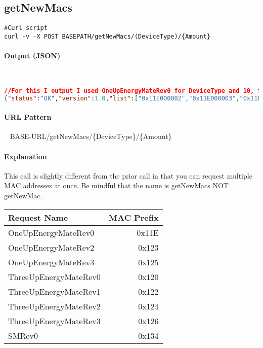 \documentclass[
10pt, %
letterpaper, %
oneside, %
headinclude,footinclude, %
BCOR5mm, %
]{scrartcl}
\begin{document}

\subsection{getNewMacs}
\begin{lstlisting}
#Curl script 
curl -v -X POST BASEPATH/getNewMacs/(DeviceType)/{Amount}
\end{lstlisting}

\paragraph{Output (JSON)}~
\begin{lstlisting}[language=json]
//For this I output I used OneUpEnergyMateRev0 for DeviceType and 10, for Amount
{"status":"OK","version":1.0,"list":["0x11E000002","0x11E000003","0x11E000004","0x11E000005","0x11E000006","0x11E000007","0x11E000008","0x11E000009","0x11E00000A","0x11E00000B"]}
\end{lstlisting}

\paragraph{URL Pattern} 
~\newline
BASE-URL/getNewMacs/\{DeviceType\}/\{Amount\}

\paragraph{Explanation}
This call is slightly different from the prior call in that you can request multiple MAC addresses at once. Be mindful that the name is getNewMacs NOT getNewMac. 
~\newline
\begin{tabular}{| l | r |}
\hline
\textbf{Request Name} & \textbf{MAC Prefix} \\
\hline
OneUpEnergyMateRev0 & 0x11E \\
OneUpEnergyMateRev2 & 0x123 \\
OneUpEnergyMateRev3 & 0x125 \\
ThreeUpEnergyMateRev0 & 0x120 \\
ThreeUpEnergyMateRev1 & 0x122 \\
ThreeUpEnergyMateRev2 & 0x124 \\
ThreeUpEnergyMateRev3 & 0x126 \\
SMRev0 & 0x134 \\
\hline
\end{tabular}
\end{document}

